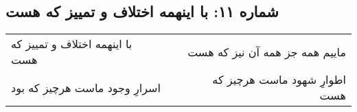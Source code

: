 \begin{center}
\section*{شماره ۱۱: با اینهمه اختلاف و تمییز که هست}
\label{sec:011}
\begin{longtable}{l p{0.5cm} r}
با اینهمه اختلاف و تمییز که هست
&&
ماییم همه جز همه آن نیز که هست
\\
اسرارِ وجود ماست هرچیز که بود
&&
اطوارِ شهود ماست هرچیز که هست
\\
\end{longtable}
\end{center}
